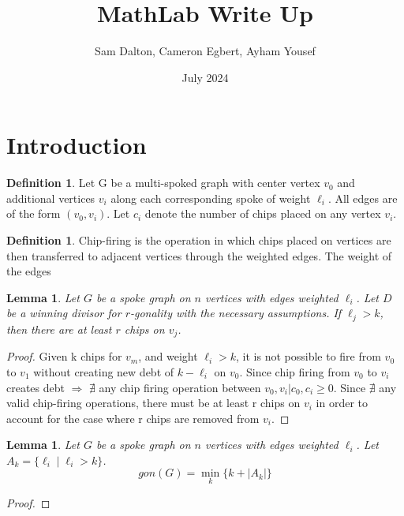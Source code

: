 \documentclass{article}
\title{MathLab Write Up}
\author{Sam Dalton, Cameron Egbert, Ayham Yousef}
\date{July 2024}
\newtheorem{lemma}[theorem]{Lemma}
\theoremstyle{definition}
\newtheorem{definition}[theorem]{Definition}
\begin{document}
\maketitle

\section{Introduction}

\begin{definition}
    Let G be a multi-spoked graph with center vertex $v_0$ and additional vertices $v_i$ along each corresponding spoke of weight $\ell_i$. All edges are of the form $(v_0,v_i)$. Let $c_i$ denote the number of chips placed on any vertex $v_i$.
\end{definition}

\begin{definition}
    Chip-firing is the operation in which chips placed on vertices are then transferred to adjacent vertices through the weighted edges. The weight of the edges 
\end{definition}



\begin{lemma}
    Let $G$ be a spoke graph on $n$ vertices with edges weighted $\ell_i$. Let $D$ be a winning divisor for $r$-gonality with the necessary assumptions. If $\ell_j>k$, then there are at least $r$ chips on $v_j$.
\end{lemma}
\begin{proof}
        Given k chips for $v_m$, and weight $\ell_i > k$, it is not possible to fire from $v_0$ to $v_1$ without creating new debt of $k-\ell_i$ on $v_0$. Since chip firing from $v_0$ to $v_i$ creates debt $\Rightarrow$ $\nexists$ any chip firing operation between $v_0,v_i |c_0,c_i\geq 0$. Since $\nexists$ any valid chip-firing operations, there must be at least r chips on $v_i$ in order to account for the case where r chips are removed from $v_i$. 

\end{proof}


\begin{lemma}
    Let $G$ be a spoke graph on $n$ vertices with edges weighted $\ell_i$. Let $A_k = \{\ell_i \mid \ell_i>k \}$.  
    $$gon(G) = \min_{k}\{k + |A_k|\}$$
\end{lemma}
\begin{proof}
    
\end{proof} 
\end{document}
